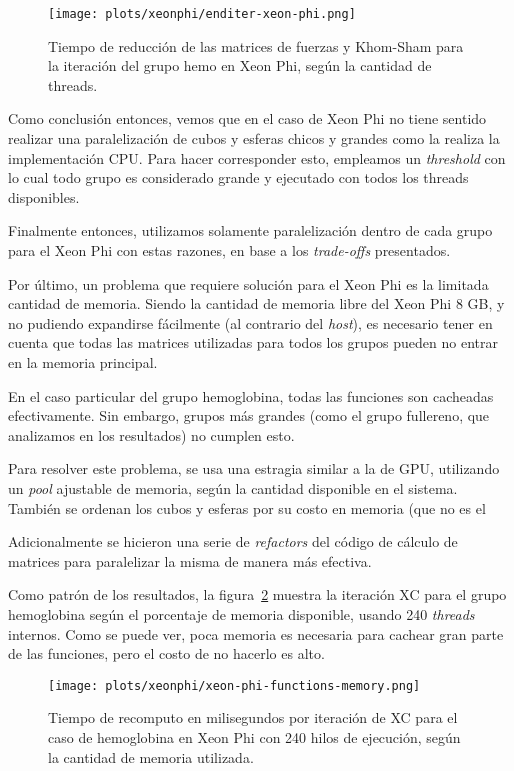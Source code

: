 \begin{figure}[htbp]
   \centering
   \texttt{[image: plots/xeonphi/enditer-xeon-phi.png]}
   \caption{Tiempo de reducci\'on de las matrices de fuerzas y Khom-Sham para
   la iteraci\'on del grupo hemo en Xeon Phi, seg\'un la cantidad de threads.}
   \label{fig:enditer-xeon-phi}
\end{figure}

Como conclusi\'on entonces, vemos que en el caso de Xeon Phi no tiene sentido
realizar una paralelizaci\'on de cubos y esferas chicos y grandes como la realiza
la implementaci\'on CPU. Para hacer corresponder esto, empleamos un \textit{threshold}
con lo cual todo grupo es considerado grande y ejecutado con todos los
threads disponibles.

Finalmente entonces, utilizamos solamente paralelizaci\'on dentro de cada grupo
para el Xeon Phi con estas razones, en base a los \textit{trade-offs} presentados.

Por \'ultimo, un problema que requiere soluci\'on para el Xeon Phi es la limitada
cantidad de memoria. Siendo la cantidad de memoria libre del Xeon Phi 8 GB, y no
pudiendo expandirse f\'acilmente (al contrario del \textit{host}), es necesario
tener en cuenta que todas las matrices utilizadas para todos los grupos pueden
no entrar en la memoria principal.

En el caso particular del grupo hemoglobina, todas las funciones son cacheadas
efectivamente. Sin embargo, grupos m\'as grandes (como el grupo fullereno, que
analizamos en los resultados) no cumplen esto.

Para resolver este problema, se usa una estragia similar a la de GPU, utilizando
un \textit{pool} ajustable de memoria, seg\'un la cantidad disponible en el sistema.
Tambi\'en se ordenan los cubos y esferas por su costo en memoria (que no es el

Adicionalmente se hicieron una serie de \textit{refactors} del c\'odigo de
c\'alculo de matrices para paralelizar la misma de manera m\'as efectiva.

Como patr\'on de los resultados, la figura~\ref{fig:xeon-phi-free-memory} muestra
la iteraci\'on XC para el grupo hemoglobina seg\'un el porcentaje de memoria
disponible, usando 240 \textit{threads} internos. Como se puede ver,
poca memoria es necesaria para cachear gran parte de las funciones, pero el
costo de no hacerlo es alto.

\begin{figure}[htbp]
   \centering
   \texttt{[image: plots/xeonphi/xeon-phi-functions-memory.png]}
   \caption{Tiempo de recomputo en milisegundos por iteraci\'on de XC para el
   caso de hemoglobina en Xeon Phi con 240 hilos de ejecuci\'on, seg\'un la
   cantidad de memoria utilizada.}
   \label{fig:xeon-phi-free-memory}
\end{figure}

